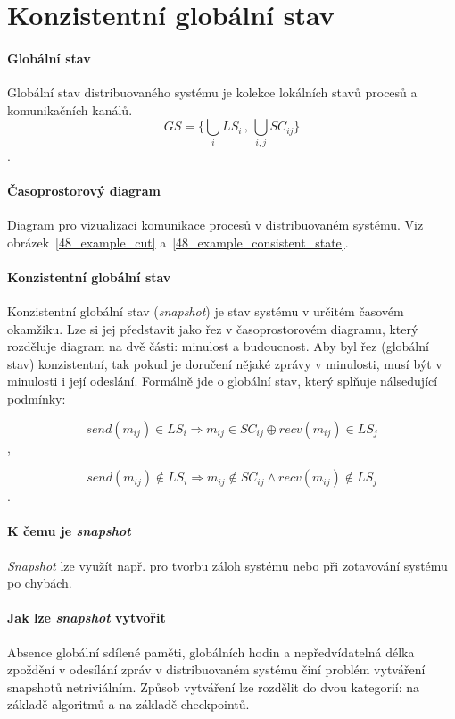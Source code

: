 \section{Konzistentní globální stav}

\paragraph*{Globální stav} Globální stav distribuovaného systému je kolekce lokálních stavů procesů a komunikačních kanálů. $$
GS = \Big\{ \bigcup_{i} LS_i \,,\, \bigcup_{i, j} SC_{ij} \Big\}
$$.

\paragraph*{Časoprostorový diagram} Diagram pro vizualizaci komunikace procesů v distribuovaném systému. Viz obrázek~\ref{48_example_cut} a~\ref{48_example_consistent_state}.

\paragraph*{Konzistentní globální stav} Konzistentní globální stav (\textit{snapshot}) je stav systému v určitém časovém okamžiku. Lze si jej představit jako řez v časoprostorovém diagramu, který rozděluje diagram na dvě části: minulost a budoucnost. Aby byl řez (globální stav) konzistentní, tak pokud je doručení nějaké zprávy v minulosti, musí být v minulosti i její odeslání. Formálně jde o globální stav, který splňuje nálsedující podmínky:

$$
send(m_{ij}) \in LS_i \Rightarrow m_{ij} \in SC_{ij} \oplus recv(m_{ij}) \in LS_j
$$,

$$
send(m_{ij}) \not\in LS_i \Rightarrow m_{ij} \not\in SC_{ij} \land recv(m_{ij}) \not\in LS_j
$$.

\paragraph*{K čemu je \textit{snapshot}} \textit{Snapshot} lze využít např. pro tvorbu záloh systému nebo při zotavování systému po chybách.

\paragraph*{Jak lze \textit{snapshot} vytvořit} Absence globální sdílené paměti, globálních hodin a nepředvídatelná délka zpoždění v odesílání zpráv v distribuovaném systému činí problém vytváření snapshotů netriviálním. Způsob vytváření lze rozdělit do dvou kategorií: na základě algoritmů a na základě checkpointů.

